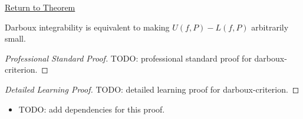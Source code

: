 \newpage
{}
\label{prf:darboux-criterion}
\begin{remark*}[Return]\hyperref[thm:darboux-criterion]{Return to Theorem}\end{remark*}

\begin{theorem*}
Darboux integrability is equivalent to making \(U(f,P)-L(f,P)\) arbitrarily
small.
\end{theorem*}

\begin{proof}[Professional Standard Proof]
\LRAProofBodyStart
TODO: professional standard proof for darboux-criterion.
\end{proof}

\begin{proof}[Detailed Learning Proof]
\LRAProofBodyStart
TODO: detailed learning proof for darboux-criterion.
\end{proof}

\begin{remark*}
\end{remark*}

\begin{dependencies}
\begin{itemize}
  \item TODO: add dependencies for this proof.
\end{itemize}
\end{dependencies}

\clearpage
